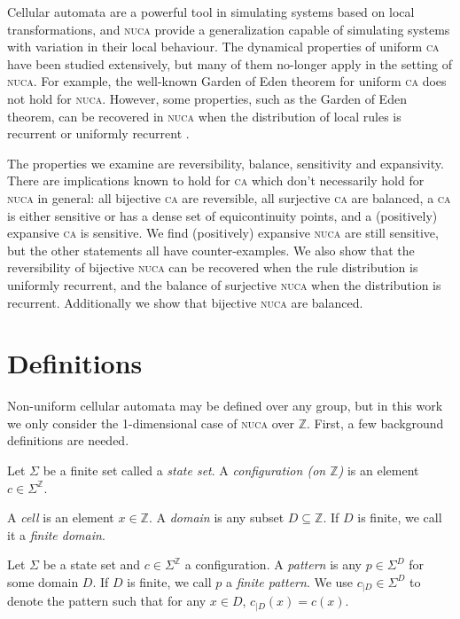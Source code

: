 \documentclass[runningheads]{llncs}
\newcommand{\Z}{\mathbb{Z}}
\begin{document}
Cellular automata are a powerful tool in simulating systems based on local transformations, and \textsc{nuca} provide a generalization capable of simulating systems with variation in their local behaviour. The dynamical properties of uniform \textsc{ca} have been studied extensively, but many of them no-longer apply in the setting of \textsc{nuca}. For example, the well-known Garden of Eden theorem for uniform \textsc{ca} does not hold for \textsc{nuca}.  However, some properties, such as the Garden of Eden theorem, can be recovered in \textsc{nuca} when the distribution of local rules is recurrent or uniformly recurrent \cite{goe}. 

The properties we examine are reversibility, balance, sensitivity and expansivity. There are implications known to hold for \textsc{ca} which don't necessarily hold for \textsc{nuca} in general: all bijective \textsc{ca} are reversible, all surjective \textsc{ca} are balanced, a \textsc{ca} is either sensitive  or has a dense set of equicontinuity points, and a (positively) expansive \textsc{ca} is sensitive. We find (positively) expansive \textsc{nuca} are still sensitive, but the other statements all have counter-examples. We also show that the reversibility of bijective \textsc{nuca} can be recovered when the rule distribution is uniformly recurrent, and the balance of surjective \textsc{nuca} when the distribution is recurrent. Additionally we show that bijective \textsc{nuca} are balanced. 

\section{Definitions}

Non-uniform cellular automata may be defined over any group, but in this work we only consider the 1-dimensional case of \textsc{nuca} over $\Z$. First, a few background definitions are needed.

\begin{definition}
Let $\Sigma$ be a finite set called a \emph{state set}. A \emph{configuration (on $\Z$)}  is an element $c \in \Sigma^\Z$.
\end{definition}

\begin{definition}
A \emph{cell} is an element $x\in \Z$. A \emph{domain} is any subset $D\subseteq \Z$. If $D$ is finite, we call it a \emph{finite domain}. 

Let $\Sigma$ be a state set and $c \in \Sigma^\Z$ a configuration. A \emph{pattern} is any $p \in \Sigma^D$ for some domain $D$. If $D$ is finite, we call $p$ a \emph{finite pattern}. We use $c_{|D}\in \Sigma^D$ to denote the pattern such that for any $x\in D$, $c_{|D} (x) = c(x)$.
\end{definition}
\end{document}
